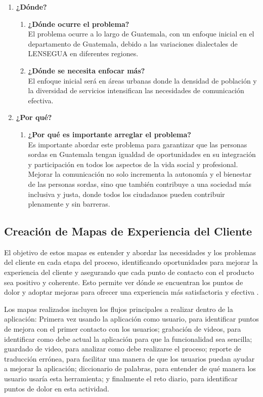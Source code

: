 \begin{enumerate}
    \item \textbf{¿Dónde?}
    \begin{enumerate}
        \item \textbf{¿Dónde ocurre el problema?} \\
        El problema ocurre a lo largo de Guatemala, con un enfoque inicial en el departamento de Guatemala, debido a las variaciones dialectales de LENSEGUA en diferentes regiones.
        \item \textbf{¿Dónde se necesita enfocar más?} \\
        El enfoque inicial será en áreas urbanas donde la densidad de población y la diversidad de servicios intensifican las necesidades de comunicación efectiva.
    \end{enumerate}

    \item \textbf{¿Por qué?}
    \begin{enumerate}
        \item \textbf{¿Por qué es importante arreglar el problema?} \\
        Es importante abordar este problema para garantizar que las personas sordas en Guatemala tengan igualdad de oportunidades en su integración y participación en todos los aspectos de la vida social y profesional. Mejorar la comunicación no solo incrementa la autonomía y el bienestar de las personas sordas, sino que también contribuye a una sociedad más inclusiva y justa, donde todos los ciudadanos pueden contribuir plenamente y sin barreras.
    \end{enumerate}
\end{enumerate}


\subsection{Creación de Mapas de Experiencia del Cliente}

El objetivo de estos mapas es entender y abordar las necesidades y los problemas del cliente en cada etapa del proceso, identificando oportunidades para mejorar la experiencia del cliente y asegurando que cada punto de contacto con el producto sea positivo y coherente. Esto permite ver dónde se encuentran los puntos de dolor y adoptar mejoras para ofrecer una experiencia más satisfactoria y efectiva \cite{Hamond2024}.

Los mapas realizados incluyen los flujos principales a realizar dentro de la aplicación: Primera vez usando la aplicación como usuario, para identificar puntos de mejora con el primer contacto con los usuarios; grabación de videos, para identificar como debe actual la aplicación para que la funcionalidad sea sencilla; guardado de video, para analizar como debe realizarse el proceso; reporte de traducción errónea, para facilitar una manera de que los usuarios puedan ayudar a mejorar la aplicación; diccionario de palabras, para entender de qué manera los usuario usaría esta herramienta; y finalmente el reto diario, para identificar puntos de dolor en esta actividad. 

